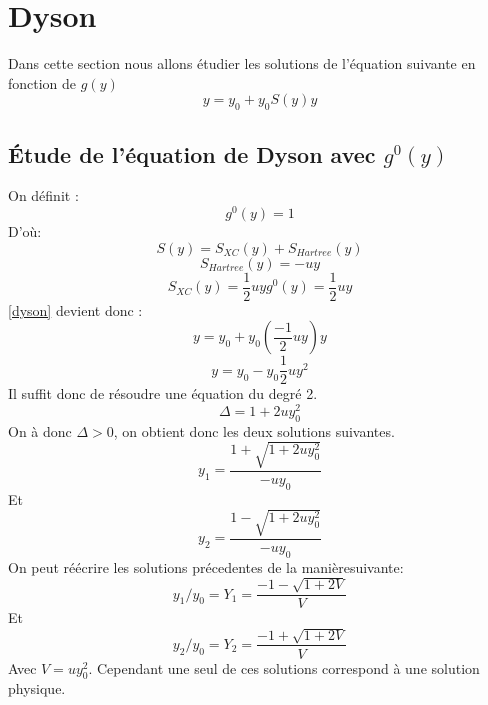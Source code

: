 \documentclass[12pt]{article}
\begin{document}
\section{Dyson}
Dans cette section nous allons \'etudier les solutions de l'\'equation suivante en fonction de $g(y)$
\begin{equation}
\label{dyson}
	y = y_0 + y_0 S(y) y
\end{equation}
\subsection{\'Etude de l'\'equation de Dyson avec $g^0(y)$}
On d\'efinit :
\begin{equation}
 g^0(y) = 1
\end{equation}
D'o\`u:
\begin{equation}
 S(y) = S_{XC}(y) + S_{Hartree}(y)
\end{equation}
\begin{equation}
 S_{Hartree}(y) = -uy
\end{equation}
\begin{equation}
 S_{XC}(y) = \frac{1}{2} u y g^0(y) = \frac{1}{2} u y
\end{equation}
\ref{dyson} devient donc :
\begin{equation}
 y = y_0 + y_0 (\frac{-1}{2} u y) y
\end{equation}
\begin{equation}
 y = y_0 - y_0 \frac{1}{2} u y^2
\end{equation}
Il suffit donc de r\'esoudre une \'equation du degr\'e 2.
\begin{equation}
 \Delta = 1 + 2 u y_0^2
\end{equation}
On \`a donc $\Delta > 0 $, on obtient donc les deux solutions suivantes.
\begin{equation}
 y_1 = \frac{1 + \sqrt{1 + 2 u y_0 ^2}}{- u y_0}
\end{equation}
Et 
\begin{equation}
 y_2 = \frac{1 - \sqrt{1 + 2 u y_0^2}}{- u y_0}
\end{equation}
On peut r\'e\'ecrire les solutions pr\'ecedentes de la mani\`eresuivante:
\begin{equation}
 y_1/y_0 = Y_1 = \frac{-1-\sqrt{1 + 2 V}}{V}
\end{equation}
Et 
\begin{equation}
 y_2/y_0 = Y_2 = \frac{-1 + \sqrt{1 + 2V}}{V}
\end{equation}
Avec $V = uy_0^2$. Cependant une seul de ces solutions correspond \`a une solution physique. 
\end{document}
